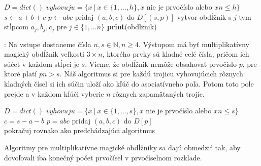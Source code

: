 \begin{algorithmic}
\STATE $D = dict()$
\STATE $vyhovuju = \{x ~|~ x \in \{1, ... , h\}, x$ nie je prvočíslo alebo $xn \leq h\}$
	\STATE $s \gets a+b+c$
	\STATE $p \gets abc$
	\STATE pridaj $(a,b,c)$ do $D[(s,p)]$
\ENDFOR
{}
				\STATE vytvor obdĺžnik s $j$-tym stĺpcom $a_{j}, b_{j}, c_{j}$ pre $j \in \{1, ... n\}$
					\STATE \textbf{print}(obdlznik)
				\ENDIF
			\ENDFOR
		\ENDIF
	\ENDFOR
\ENDFOR
\end{algorithmic}

\begin{subalg}: Na vstupe dostaneme čísla $n,s \in \mathbb{N}, n \geq 4$. Výstupom má byť multiplikatívny magický obdĺžnik veľkosti $3 \times n$, ktorého prvky sú kladné celé čísla, pričom ich súčet v každom stĺpci je $s$. Vieme, že obdĺžnik nemôže obsahovať prvočíslo $p$, pre ktoré platí $pn > s$. Náš algoritmus si pre každú trojicu vyhovujúcich rôznych kladných čísel si ich súčin uloží ako kľúč do asociatívneho poľa. Potom toto pole prejde a v každom kľúči vyberie $n$ rôznych zapamätaných trojíc.
\end{subalg}

\begin{algorithmic}
\STATE $D = dict()$
\STATE $vyhovuju = \{x ~|~ x \in \{1, ... , s\}, x$ nie je prvočíslo alebo $xn \leq s\}$
	\STATE $c = s-a-b$
		\STATE $p = abc$
		\STATE pridaj $(a,b,c)$ do $D[p]$ \\
	\ENDIF
\ENDFOR
pokračuj rovnako ako predchádzajúci algoritmus
\end{algorithmic}

\begin{subnote} Algoritmy pre multiplikatívne magické obdĺžniky sa dajú obmedziť tak, aby dovoľovali iba konečný počet prvočísel v prvočíselnom rozklade.
\end{subnote} 

